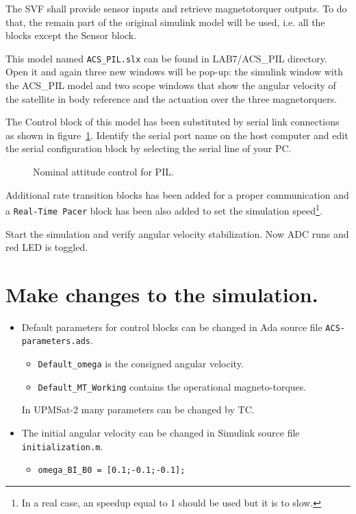 The SVF shall provide sensor inputs and retrieve magnetotorquer outputs. To do that, the remain part of the original simulink model will be used, i.e. all the blocks except the Sensor block.

This model named {\tt ACS\_PIL.slx} can be found in LAB7/ACS\_PIL directory. Open it and again three new windows will be pop-up: the simulink window with the ACS\_PIL model and two scope windows that show the angular velocity of the satellite in body reference and the actuation over the three magnetorquers.

The Control block of this model has been substituted by serial link connections as shown in figure~\ref{fig:nac-pil}. Identify the serial port name on the host computer and edit the serial configuration block by selecting the serial line of your PC.

\begin{figure}[h]
            \caption{Nominal attitude control for PIL.}
            \label{fig:nac-pil}
\end{figure}

Additional rate transition blocks has been added for a proper communication and a {\tt Real-Time Pacer} block has been also added to set the simulation speed\footnote{In a real case, an speedup equal to 1 should be used but it is to slow.}.

Start the simulation and verify angular velocity stabilization. Now ADC runs and red LED is toggled. 

\section{Make changes to the simulation.}

\begin{itemize}
\item Default parameters for control blocks can be changed in Ada source file {\tt ACS-parameters.ads}.
\begin{itemize}
\item {\tt Default\_omega} is the consigned angular velocity.
\item {\tt Default\_MT\_Working} contains the operational magneto-torques.
\end{itemize}

In UPMSat-2 many parameters can be changed by TC.
\item The initial angular velocity can be changed in Simulink source file {\tt initialization.m}.
\begin{itemize}
\item {\tt omega\_BI\_B0 = [0.1;-0.1;-0.1];}
\end{itemize}
\end{itemize}
